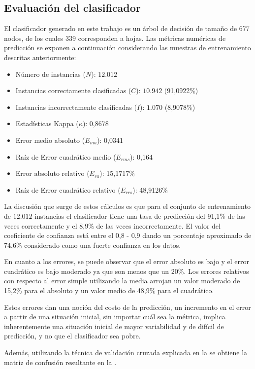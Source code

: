 \subsection{Evaluación del clasificador}

El clasificador generado en este trabajo es un árbol de decisión de
tamaño de $677$ nodos, de los cuales $339$ corresponden a hojas.
Las métricas numéricas de predicción se exponen a continuación considerando
las muestras de entrenamiento descritas anteriormente: 
\begin{itemize}
\item Número de instancias ($N$): $12.012$ 
\item Instancias correctamente clasificadas ($C$): $10.942$ (91,0922\%)
\item Instancias incorrectamente clasificadas ($I$): $1.070$ (8,9078\%)
\item Estadísticas Kappa ($\kappa$): 0,8678 
\item Error medio absoluto ($E_{ma}$): 0,0341
\item Raíz de Error cuadrático medio ($E_{rms}$): 0,164
\item Error absoluto relativo ($E_{ra}$): 15,1717\% 
\item Raíz de Error cuadrático relativo ($E_{rrs}$): 48,9126\%
\end{itemize}
La discusión que surge de estos cálculos es que para el conjunto de
entrenamiento de $12.012$ instancias el clasificador tiene una tasa
de predicción del 91,1\% de las veces correctamente y el 8,9\% de
las veces incorrectamente. El valor del coeficiente de confianza está
entre el 0,8 - 0,9 dando un porcentaje aproximado de 74,6\% considerado
como una fuerte confianza en los datos.

En cuanto a los errores, se puede observar que el error absoluto es
bajo y el error cuadrático es bajo moderado ya que son menos que un
20\%. Los errores relativos con respecto al error simple utilizando
la media arrojan un valor moderado de 15,2\% para el absoluto y un
valor medio de 48,9\% para el cuadrático. 

Estos errores dan una noción del costo de la predicción, un incremento
en el error a partir de una situación inicial, sin importar cuál sea
la métrica, implica inherentemente una situación inicial de mayor
variabilidad y de difícil de predicción, y no que el clasificador
sea pobre.

Además, utilizando la técnica de validación cruzada explicada en la
 se obtiene la matriz de confusión resultante
en la . 

